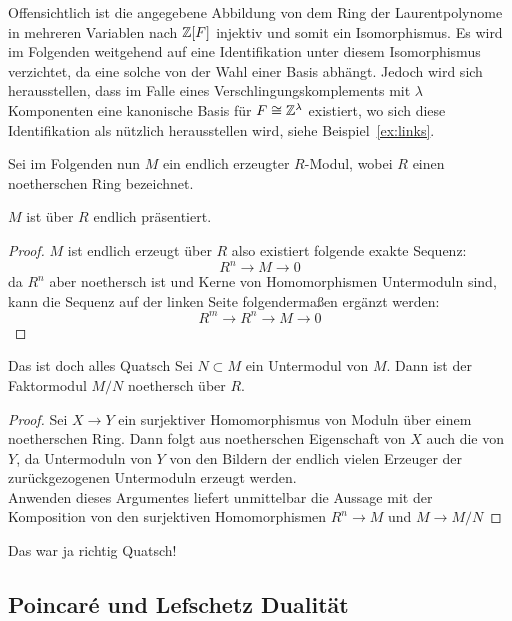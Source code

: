 \begin{bem}
	Offensichtlich ist die angegebene Abbildung von dem Ring der Laurentpolynome in mehreren Variablen nach $\mathbb{Z}[F]$ injektiv und somit ein Isomorphismus. Es wird im Folgenden weitgehend auf eine Identifikation unter diesem Isomorphismus verzichtet, da eine solche von der Wahl einer Basis abhängt. Jedoch wird sich herausstellen, dass im Falle eines Verschlingungskomplements mit $\lambda$ Komponenten eine kanonische Basis für $F\cong \mathbb{Z}^\lambda$ existiert, wo sich diese Identifikation als nützlich herausstellen wird, siehe Beispiel~\ref{ex:links}.
\end{bem}


Sei im Folgenden nun $M$ ein endlich erzeugter $R$-Modul, wobei $R$ einen noetherschen Ring bezeichnet.
\begin{lem}
	$M$ ist über $R$ endlich präsentiert. 
\end{lem}
\begin{proof}
	$M$ ist endlich erzeugt über $R$ also existiert folgende exakte Sequenz:
	\[
		R^n \to M \to 0
	\]
	da $R^n$ aber noethersch ist und Kerne von Homomorphismen Untermoduln sind, kann die Sequenz auf der linken Seite folgendermaßen ergänzt werden:
	\[
		R^m \to R^n \to M \to 0
	\]
\end{proof}

\begin{lem}
	\label{lem:quotient} Das ist doch alles Quatsch
	Sei $N\subset M$ ein Untermodul von $M$. Dann ist der Faktormodul $M/N$ noethersch über $R$.
\end{lem}
\begin{proof}
	Sei $X \to Y$ ein surjektiver Homomorphismus von Moduln über einem noetherschen Ring. Dann folgt aus noetherschen Eigenschaft von $X$ auch die von $Y$, da Untermoduln von $Y$ von den Bildern der endlich vielen Erzeuger der zurückgezogenen Untermoduln erzeugt werden. \\
	Anwenden dieses Argumentes liefert unmittelbar die Aussage mit der Komposition von den surjektiven Homomorphismen $R^n \to M$ und $M \to M/N$
\end{proof} 
Das war ja richtig Quatsch!

\subsection{Poincaré und Lefschetz Dualität}
\label{sec:poinc}

